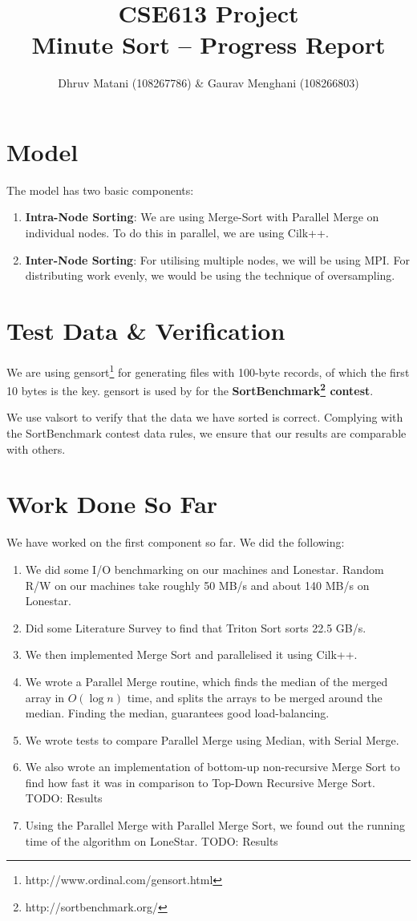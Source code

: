 \documentclass{article}
\title{CSE613 Project\\Minute Sort -- Progress Report}
\author{Dhruv Matani (108267786) \& Gaurav Menghani (108266803)}
\begin{document}
\maketitle

\clearpage

\section{Model}
The model has two basic components:
\begin{enumerate}
\item {\bf{Intra-Node Sorting}}: We are using Merge-Sort with Parallel Merge on individual nodes. To do this in parallel, 
we are using Cilk++. 

\item {\bf{Inter-Node Sorting}}: For utilising multiple nodes, we will be using MPI. For distributing work evenly, 
we would be using the technique of oversampling.
\end{enumerate}

\section{Test Data \& Verification}
We are using gensort\footnote{http://www.ordinal.com/gensort.html} for generating files with 100-byte records, 
of which the first 10 bytes is the key. gensort is used by for the {\bf SortBenchmark\footnote{http://sortbenchmark.org/} contest}.

We use valsort to verify that the data we have sorted is correct. Complying with the SortBenchmark contest data
rules, we ensure that our results are comparable with others.

\section{Work Done So Far}
We have worked on the first component so far. We did the following:
\begin{enumerate}
\item We did some I/O benchmarking on our machines and Lonestar. Random R/W on our machines take roughly 50 MB/s and about 140 MB/s on Lonestar. 
\item Did some Literature Survey to find that Triton Sort sorts 22.5 GB/s.
\item We then implemented Merge Sort and parallelised it using Cilk++.
\item We wrote a Parallel Merge routine, which finds the median of the merged array in $O(\log{n})$ time, and splits the arrays to be merged around the median. Finding the median, guarantees good load-balancing.
\item We wrote tests to compare Parallel Merge using Median, with Serial Merge.
\item We also wrote an implementation of bottom-up non-recursive Merge Sort to find how fast it was in comparison to Top-Down Recursive Merge Sort. TODO: Results
\item Using the Parallel Merge with Parallel Merge Sort, we found out the running time of the algorithm on LoneStar. TODO: Results
\end{enumerate}
\end{document}
